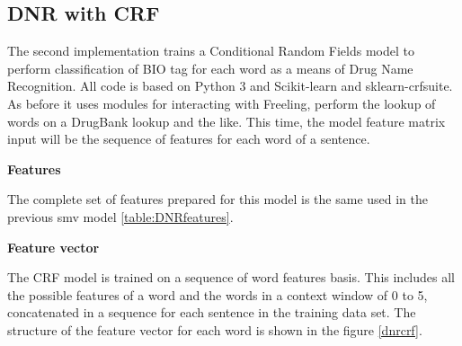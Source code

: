 \subsection{DNR with CRF}

The second implementation trains a Conditional Random Fields model to perform classification of BIO tag for each word as a means of Drug Name Recognition. All code is based on Python 3 and Scikit-learn and sklearn-crfsuite. As before it uses modules for interacting with Freeling, perform the lookup of words on a DrugBank lookup and the like. This time, the model feature matrix input will be the sequence of features for each word of a sentence. 

\textbf{Features}

The complete set of features prepared for this model is the same used in the previous smv model \ref{table:DNRfeatures}.

\textbf{Feature vector}

The CRF model is trained on a sequence of word features basis. This includes all the possible features of a word and the words in a context window of 0 to 5, concatenated in a sequence for each sentence in the training data set. The structure of the feature vector for each word is shown in the figure \ref{dnrcrf}.


